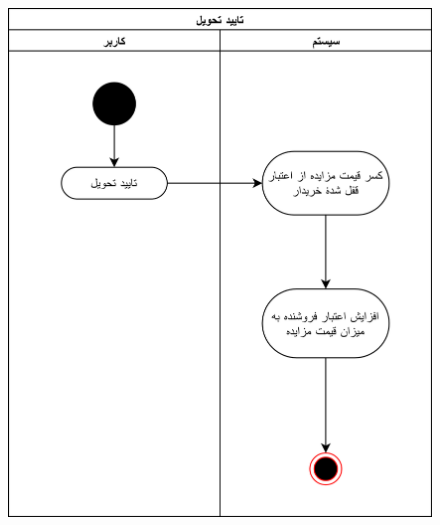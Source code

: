 \documentclass{article}
\begin{document}
\begin{figure}[htp]
\includegraphics[width = 1\textwidth]{../Activity Diagrams/Activity 4.png}
\caption{}
\label{activity3}
\end{figure}
\end{document}
